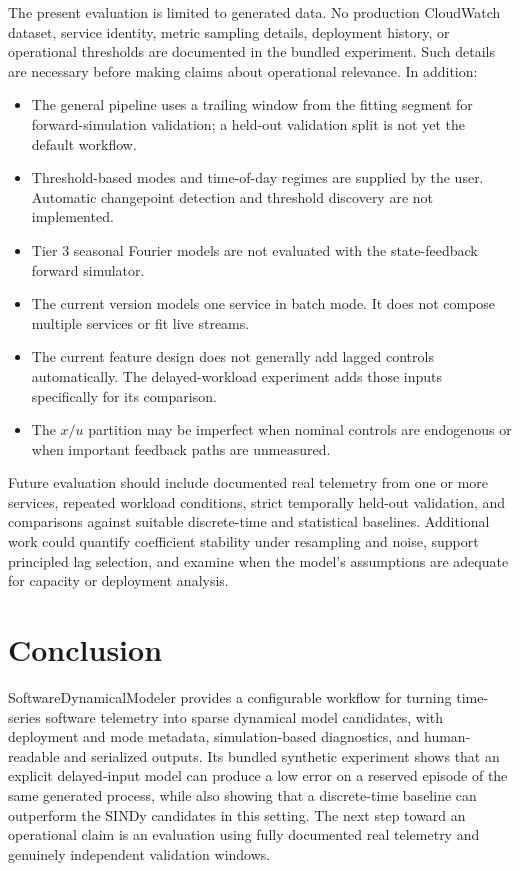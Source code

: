 \documentclass[11pt]{article}
\begin{document}
The present evaluation is limited to generated data. No production CloudWatch dataset, service identity, metric sampling details, deployment history, or operational thresholds are documented in the bundled experiment. Such details are necessary before making claims about operational relevance. In addition:
\begin{itemize}
  \item The general pipeline uses a trailing window from the fitting segment for forward-simulation validation; a held-out validation split is not yet the default workflow.
  \item Threshold-based modes and time-of-day regimes are supplied by the user. Automatic changepoint detection and threshold discovery are not implemented.
  \item Tier 3 seasonal Fourier models are not evaluated with the state-feedback forward simulator.
  \item The current version models one service in batch mode. It does not compose multiple services or fit live streams.
  \item The current feature design does not generally add lagged controls automatically. The delayed-workload experiment adds those inputs specifically for its comparison.
  \item The $x/u$ partition may be imperfect when nominal controls are endogenous or when important feedback paths are unmeasured.
\end{itemize}

Future evaluation should include documented real telemetry from one or more services, repeated workload conditions, strict temporally held-out validation, and comparisons against suitable discrete-time and statistical baselines. Additional work could quantify coefficient stability under resampling and noise, support principled lag selection, and examine when the model's assumptions are adequate for capacity or deployment analysis.

\section{Conclusion}

SoftwareDynamicalModeler provides a configurable workflow for turning time-series software telemetry into sparse dynamical model candidates, with deployment and mode metadata, simulation-based diagnostics, and human-readable and serialized outputs. Its bundled synthetic experiment shows that an explicit delayed-input model can produce a low error on a reserved episode of the same generated process, while also showing that a discrete-time baseline can outperform the SINDy candidates in this setting. The next step toward an operational claim is an evaluation using fully documented real telemetry and genuinely independent validation windows.
\end{document}
